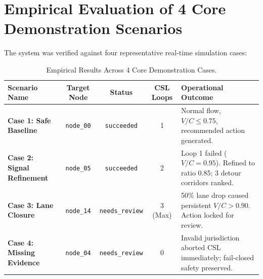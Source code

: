 \section{Empirical Evaluation of 4 Core Demonstration Scenarios}
The system was verified against four representative real-time simulation cases:

\begin{table}[H]
\centering
\caption{Empirical Results Across 4 Core Demonstration Cases.}
\label{tab:showcase_cases}
\begin{tabular}{|p{3.2cm}|c|c|c|p{4.2cm}|}
\hline
\rowcolor{blue!10}
\textbf{Scenario Name} & \textbf{Target Node} & \textbf{Status} & \textbf{CSL Loops} & \textbf{Operational Outcome} \\
\hline
\textbf{Case 1: Safe Baseline} & \texttt{node\_00} & \texttt{succeeded} & 1 & Normal flow, $V/C \le 0.75$, recommended action generated. \\
\hline
\textbf{Case 2: Signal Refinement} & \texttt{node\_05} & \texttt{succeeded} & 2 & Loop 1 failed ($V/C=0.95$). Refined to ratio 0.85; 3 detour corridors ranked. \\
\hline
\textbf{Case 3: Lane Closure} & \texttt{node\_14} & \texttt{needs\_review} & 3 (Max) & 50\% lane drop caused persistent $V/C > 0.90$. Action locked for review. \\
\hline
\textbf{Case 4: Missing Evidence} & \texttt{node\_04} & \texttt{needs\_review} & 0 & Invalid jurisdiction aborted CSL immediately; fail-closed safety preserved. \\
\hline
\end{tabular}
\end{table}
